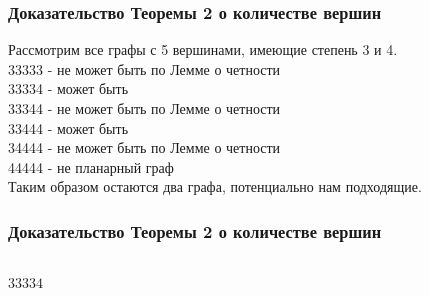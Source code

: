 \documentclass[10pt,pdf,hyperref={unicode}]{beamer}
\begin{document}
\begin{frame}
	\frametitle{Доказательство Теоремы 2 о количестве вершин}
	Рассмотрим все графы с 5 вершинами, имеющие степень 3 и 4.\\
\hfill \break	
	{\large	
		33333 - не может быть по Лемме о четности\\
		33334 - может быть\\
		33344 - не может быть по Лемме о четности\\
		33444 - может быть\\
		34444 - не может быть по Лемме о четности\\
		44444 - не планарный граф
\\	
\hfill \break	
	Таким образом остаются два графа, потенциально нам подходящие.
}
\end{frame}
\begin{frame}
	\frametitle{Доказательство Теоремы 2 о количестве вершин}
	\begin{columns}
		\begin{block}{}
			{\large $33334$}
		\end{block}


\end{columns}
\end{frame}
\end{document}
